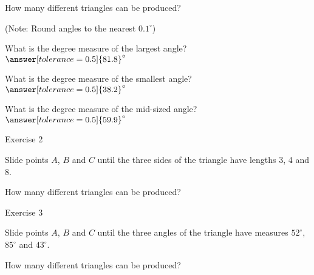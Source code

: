 \documentclass{ximera}
\begin{document}
\begin{question}
How many different triangles can be produced?
\begin{multipleChoice}
\end{multipleChoice}

\begin{question}
(Note: Round angles to the nearest $0.1^\circ$)

What is the degree measure of the largest angle? $\answer[tolerance=0.5]{81.8}^\circ$

What is the degree measure of the smallest angle? $\answer[tolerance=0.5]{38.2}^\circ$

What is the degree measure of the mid-sized angle? $\answer[tolerance=0.5]{59.9}^\circ$
\end{question}
\end{question}

\bigskip

Exercise 2

Slide points $A$, $B$ and $C$ until the three sides of the triangle have lengths 3, 4 and 8. 

\begin{question}
How many different triangles can be produced?
\begin{multipleChoice}
\end{multipleChoice}

\end{question}

\bigskip

Exercise 3

Slide points $A$, $B$ and $C$ until the three angles of the triangle have measures $52^\circ$, $85^\circ$ and $43^\circ$. 

\begin{question}
How many different triangles can be produced?
\begin{multipleChoice}
\end{multipleChoice}

\end{question}
\end{document}
